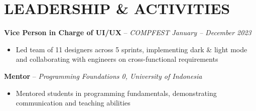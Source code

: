 \documentclass[10pt,a4paper]{article}
\begin{document}
\section*{LEADERSHIP \& ACTIVITIES}
\vspace{-2pt}
\textbf{Vice Person in Charge of UI/UX} – \textit{COMPFEST} \hfill \textit{January – December 2023} \\[-6pt]
\begin{itemize}
    \item Led team of 11 designers across 5 sprints, implementing dark \& light mode and collaborating with engineers on cross-functional requirements
\end{itemize}

\textbf{Mentor} – \textit{Programming Foundations 0, University of Indonesia} \\[-6pt]
\begin{itemize}
    \item Mentored students in programming fundamentals, demonstrating communication and teaching abilities
\end{itemize}
\end{document}
